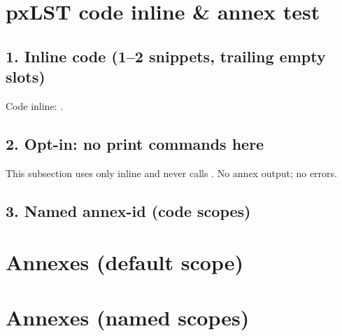 \documentclass{article}
\begin{document}
\section*{pxLST code inline \& annex test}

\subsection*{1. Inline code (1--2 snippets, trailing empty slots)}
Code inline: .

\subsection*{2. Opt-in: no print commands here}
This subsection uses only inline  and never calls \printPxCodeAnnex. No annex output; no errors.

\subsection*{3. Named annex-id (code scopes)}

\section*{Annexes (default scope)}
\printPxCodeAnnex[title=Code snippets (default)]

\section*{Annexes (named scopes)}
\printPxCodeAnnex[annex-id=scope-a, title=Annex A code]
\printPxCodeAnnex[annex-id=scope-b, title=Annex B code]
\end{document}
